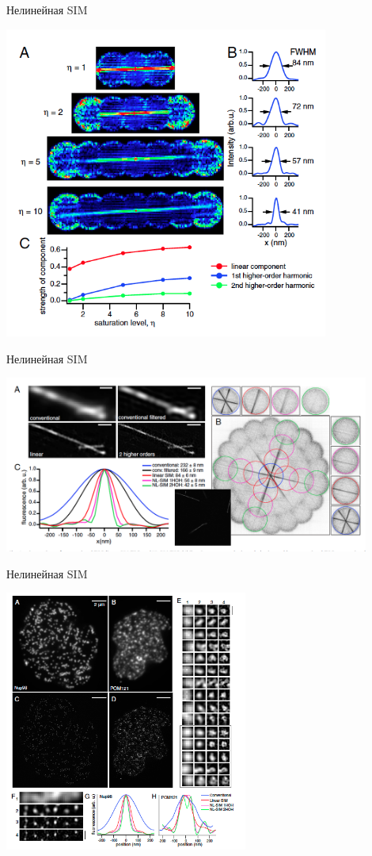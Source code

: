 \documentclass[9pt, compress, xcolor=table]{beamer}
\begin{document}
\begin{frame}{Нелинейная SIM}
\begin{center}
\includegraphics[width=0.8\textwidth]{nlsim9}
\end{center}
\end{frame}

\begin{frame}{Нелинейная SIM}
\begin{center}
\includegraphics[width=0.9\textwidth]{nlsim10}
\end{center}
\end{frame}

\begin{frame}{Нелинейная SIM}
\begin{center}
\includegraphics[width=0.6\textwidth]{nlsim11}
\end{center}
\end{frame}
\end{document}
